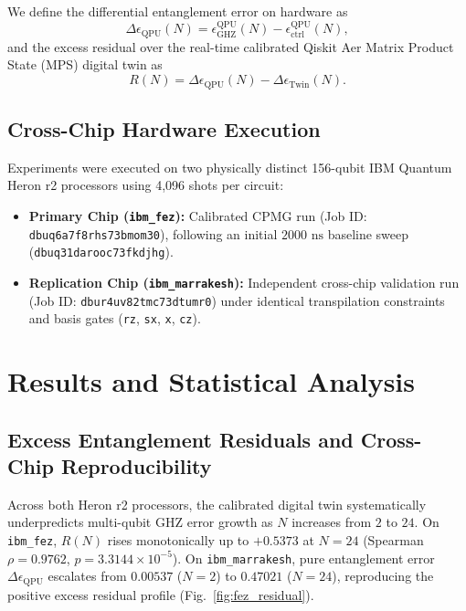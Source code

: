 \documentclass[11pt,a4paper,twocolumn]{article}
\begin{document}
We define the differential entanglement error on hardware as
\begin{equation}
    \Delta\epsilon_{\text{QPU}}(N) = \epsilon_{\text{GHZ}}^{\text{QPU}}(N) - \epsilon_{\text{ctrl}}^{\text{QPU}}(N),
\end{equation}
and the excess residual over the real-time calibrated Qiskit Aer Matrix Product State (MPS) digital twin as
\begin{equation}
    R(N) = \Delta\epsilon_{\text{QPU}}(N) - \Delta\epsilon_{\text{Twin}}(N).
\end{equation}

\subsection{Cross-Chip Hardware Execution}
Experiments were executed on two physically distinct 156-qubit IBM Quantum Heron r2 processors using 4,096 shots per circuit:
\begin{itemize}
    \item \textbf{Primary Chip (\texttt{ibm\_fez}):} Calibrated CPMG run (Job ID: \texttt{dbuq6a7f8rhs73bmom30}), following an initial $2000\text{ ns}$ baseline sweep (\texttt{dbuq31darooc73fkdjhg}).
    \item \textbf{Replication Chip (\texttt{ibm\_marrakesh}):} Independent cross-chip validation run (Job ID: \texttt{dbur4uv82tmc73dtumr0}) under identical transpilation constraints and basis gates (\texttt{rz}, \texttt{sx}, \texttt{x}, \texttt{cz}).
\end{itemize}

\section{Results and Statistical Analysis}

\subsection{Excess Entanglement Residuals and Cross-Chip Reproducibility}
Across both Heron r2 processors, the calibrated digital twin systematically underpredicts multi-qubit GHZ error growth as $N$ increases from $2$ to $24$. On \texttt{ibm\_fez}, $R(N)$ rises monotonically up to $+0.5373$ at $N=24$ (Spearman $\rho = 0.9762$, $p = 3.3144 \times 10^{-5}$). On \texttt{ibm\_marrakesh}, pure entanglement error $\Delta\epsilon_{\text{QPU}}$ escalates from $0.00537$ ($N=2$) to $0.47021$ ($N=24$), reproducing the positive excess residual profile (Fig.~\ref{fig:fez_residual}).
\end{document}
